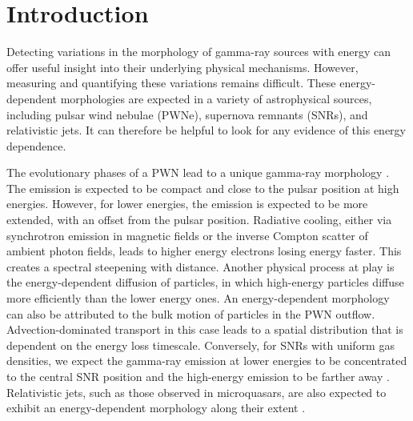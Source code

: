 \documentclass{aa}
\begin{document}

   \maketitle


\section{Introduction}
\label{sec:intro}

Detecting variations in the morphology of gamma-ray sources with energy can offer useful insight into their underlying physical mechanisms. However, measuring and quantifying these variations remains difficult. These energy-dependent morphologies are expected in a variety of astrophysical sources, including pulsar wind nebulae (PWNe), supernova remnants (SNRs), and relativistic jets. It can therefore be helpful to look for any evidence of this energy dependence.

The evolutionary phases of a PWN lead to a unique gamma-ray morphology \citep{Gaensler_2006}. The emission is expected to be compact and close to the pulsar position at high energies. However, for lower energies, the emission is expected to be more extended, with an offset from the pulsar position. Radiative cooling, either via synchrotron emission in magnetic fields or the inverse Compton scatter of ambient photon fields, leads to higher energy electrons losing energy faster. This creates a spectral steepening with distance. Another physical process at play is the energy-dependent diffusion of particles, in which high-energy particles diffuse more efficiently than the lower energy ones. An energy-dependent morphology can also be attributed to the bulk motion of particles in the PWN outflow. Advection-dominated transport in this case leads to a spatial distribution that is dependent on the energy loss timescale.
Conversely, for SNRs with uniform gas densities, we expect the gamma-ray emission at lower energies to be concentrated to the central SNR position and the high-energy emission to be farther away \citep{2019_edep_SNR,2021_edep_SNR}. 
Relativistic jets, such as those observed in microquasars, are also expected to exhibit an energy-dependent morphology along their extent \citep{SS433_Laura_2024}.
\end{document}
